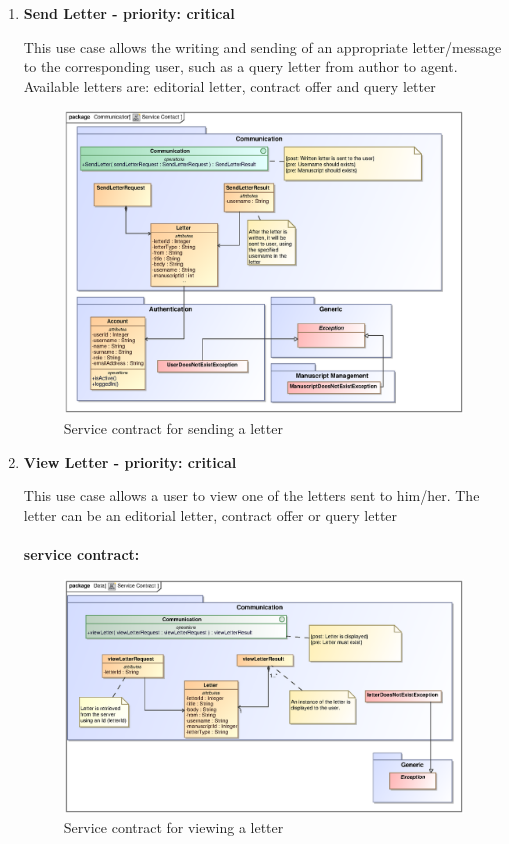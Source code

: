 \begin{enumerate}
\item \textbf{Send Letter - priority: critical}
\par{This use case allows the writing and sending of an appropriate letter/message to the corresponding user, such as a query letter from author to agent. Available letters are: editorial letter, contract offer and query letter}

\begin{figure}[h]
\includegraphics[scale=0.9]{epsImages/Communication/sendLetterServiceContract.eps}
\caption{Service contract for sending a letter}
\end{figure}

\newpage
\item \textbf{View Letter - priority: critical}\\
\par{This use case allows a user to view one of the letters sent to him/her. The letter can be an editorial letter, contract offer or query letter }\\ \\

\textbf{service contract:}

\begin{figure}[h]
\includegraphics[scale=0.9]{epsImages/Communication/viewLetterServiceContract.eps}
\caption{Service contract for viewing a letter}
\end{figure}


\end{enumerate}
